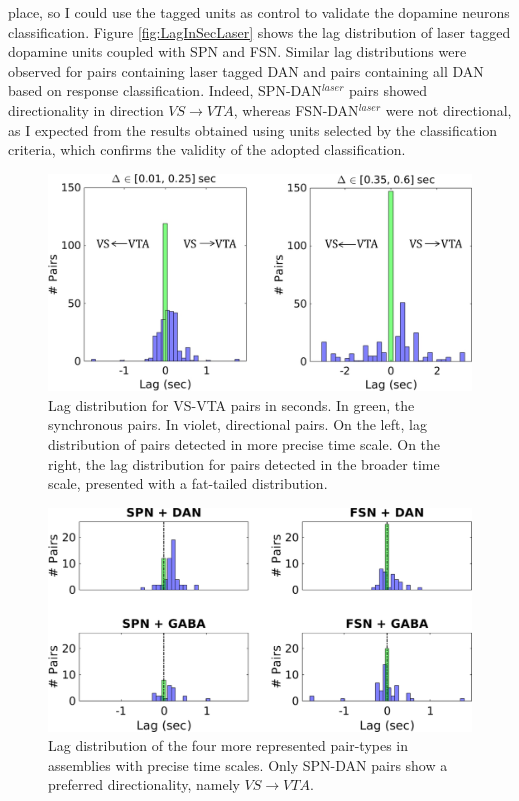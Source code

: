 place, so I could use the tagged units as control to validate the dopamine neurons classification. Figure \ref{fig:LagInSecLaser} shows the lag distribution of laser tagged dopamine units coupled with SPN and FSN. Similar lag distributions were observed for pairs containing laser tagged DAN and pairs containing all DAN based on response classification. Indeed, SPN-DAN$^{laser}$ pairs showed directionality in direction $VS\rightarrow VTA$, whereas FSN-DAN$^{laser}$ were not directional, as I expected from the results obtained using units selected by the classification criteria, which confirms the validity of the adopted classification.\\
\begin{figure}[H]
\centering
\includegraphics[scale=0.65]{figures/LagGeneral1.pdf}
\caption{Lag distribution for VS-VTA pairs in seconds. In green, the synchronous pairs. In violet, directional pairs. On the left, lag distribution of pairs detected in more precise time scale. On the right, the lag distribution for pairs detected in the broader time scale, presented with a fat-tailed distribution.}
\label{fig:LagInSecAll}
\end{figure}
\begin{figure}[H]
\centering
\includegraphics[scale=0.52]{figures/LagSec4Typo3VS.pdf}
\caption{Lag distribution of the four more represented pair-types in assemblies with precise time scales. Only SPN-DAN pairs show a preferred directionality, namely $VS\rightarrow VTA$.}
\label{fig:LagInSec4typo}
\end{figure}
